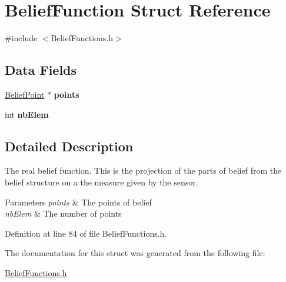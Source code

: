 \hypertarget{struct_belief_function}{
\section{BeliefFunction Struct Reference}
\label{struct_belief_function}
}


{\ttfamily \#include $<$BeliefFunctions.h$>$}

\subsection*{Data Fields}
\begin{DoxyCompactItemize}
\item 
\hypertarget{struct_belief_function_a45c6c1d0080e66467d33d23c68bf5668}{
\hyperlink{struct_belief_point}{BeliefPoint} $\ast$ {\bfseries points}}
\label{struct_belief_function_a45c6c1d0080e66467d33d23c68bf5668}

\item 
\hypertarget{struct_belief_function_aa2b8f44292eba74332d7b3d1fb586d88}{
int {\bfseries nbElem}}
\label{struct_belief_function_aa2b8f44292eba74332d7b3d1fb586d88}

\end{DoxyCompactItemize}


\subsection{Detailed Description}
The real belief function. This is the projection of the parts of belief from the belief structure on a the measure given by the sensor. 
\begin{DoxyParams}{Parameters}
{\em points} & The points of belief \\
\hline
{\em nbElem} & The number of points \\
\hline
\end{DoxyParams}


Definition at line 84 of file BeliefFunctions.h.



The documentation for this struct was generated from the following file:\begin{DoxyCompactItemize}
\item 
\hyperlink{_belief_functions_8h}{BeliefFunctions.h}\end{DoxyCompactItemize}
